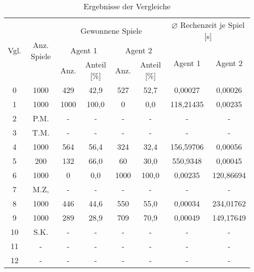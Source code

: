 \begin{table}[ht]
\begin{center}
\begin{tabular}{| c | c | c | c | c | c | c | c |} \hline
\multirow{3}{*}{Vgl.} & \multirow{3}{*}{Anz. Spiele} & \multicolumn{4}{|c|}{Gewonnene Spiele} & \multicolumn{2}{|c|}{$\varnothing$ Rechenzeit je Spiel [s]} \\ \cline{3-8}
                      &                              & \multicolumn{2}{|c|}{Agent 1} & \multicolumn{2}{|c|}{Agent 2} & \multirow{2}{*}{Agent 1} & \multirow{2}{*}{Agent 2} \\ \cline{3-6}
                      &                              & Anz. & Anteil [\%]            & Anz. & Anteil [\%]            &                          &                          \\ \hline
\hline
 0 & 1000 &  429 &  42,9 &  527 &  52,7 &   0,00027 &   0,00026 \\ \hline
 \hline
 1 & 1000 & 1000 & 100,0 &    0 &   0,0   & 118,21435 &   0,00235 \\ \hline
 2 & P.M. & -    & -     & -    & -     & -         & -         \\ \hline
 3 & T.M. & -    & -     & -    & -     & -         & -         \\ \hline
 4 & 1000 &  564 &  56,4 &  324 &  32,4 & 156,59706 &   0,00056 \\ \hline
 5 &  200 &  132 &  66,0 &   60 &  30,0 & 550,9348  &   0,00045 \\ \hline
 \hline
 6 & 1000 &    0 &   0,0 & 1000 & 100,0 &   0,00235 & 120,86694 \\ \hline
 7 & M.Z, & -    & -     & -    & -     & -         & -         \\ \hline
 8 & 1000 &  446 &  44,6 &  550 &  55,0 &   0,00034 & 234,01762 \\ \hline
 9 & 1000 &  289 &  28,9 &  709 &  70,9 &   0,00049 & 149,17649 \\ \hline
10 & S.K. & -    & -     & -    & -     & -         & -         \\ \hline
\hline
11 & -    & -    & -     & -    & -     & -         & -         \\ \hline
12 & -    & -    & -     & -    & -     & -         & -         \\ \hline
\end{tabular}
\end{center}
\caption{Ergebnisse der Vergleiche}
\label{tbl:cmp-results}
\end{table}
\newpage

